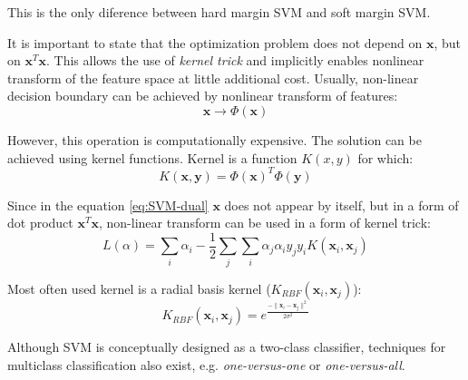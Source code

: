 \begin{appendix}
This is the only diference between hard margin SVM and soft margin SVM.

It is important to state that the optimization problem does not depend on $\mathbf{x}$, but on $\mathbf{x}^T\mathbf{x}$. This allows the use of \emph{kernel trick} and implicitly enables nonlinear transform of the feature space at little additional cost. Usually, non-linear decision boundary can be achieved by nonlinear transform of features:
\begin{equation} 
\mathbf{x} \rightarrow \Phi(\mathbf{x})
\end{equation}

However, this operation is computationally expensive. The solution can be achieved using kernel functions. Kernel is a function $K(x,y)$ for which:
\begin{equation} 
K(\mathbf{x},\mathbf{y}) = \Phi(\mathbf{x})^T  \Phi(\mathbf{y})
\end{equation}

Since in the equation \ref{eq:SVM-dual} $\mathbf{x}$ does not appear by itself, but in a form of dot product $\mathbf{x}^T\mathbf{x}$, non-linear transform can be used in a form of kernel trick:
\begin{equation} 
L(\alpha) = \sum_i \alpha_i - \frac{1}{2} \sum_j \sum_i \alpha_j \alpha_i y_j y_i K(\mathbf{x}_i, \mathbf{x}_j)
\end{equation}

Most often used kernel is a radial basis kernel ($K_{RBF}(\mathbf{x}_i,\mathbf{x}_j)$):
\begin{equation} 
K_{RBF}(\mathbf{x}_i,\mathbf{x}_j) = e^\frac{-\parallel \mathbf{x}_i - \mathbf{x}_j\parallel^2}{2\sigma^2}
\end{equation}

Although SVM is conceptually designed as a two-class classifier, techniques for multiclass classification also exist, e.g. \emph{one-versus-one} or \emph{one-versus-all}.

\end{appendix}